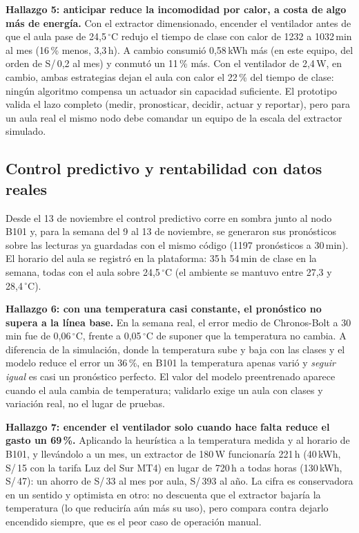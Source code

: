 \documentclass[10pt,a4paper]{article}
\begin{document}
\textbf{Hallazgo 5: anticipar reduce la incomodidad por calor, a costa de algo más de energía.} Con el extractor dimensionado, encender el ventilador antes de que el aula pase de 24,5\,$^\circ$C redujo el tiempo de clase con calor de 1232 a 1032\,min al mes (16\,\% menos, 3,3\,h). A cambio consumió 0,58\,kWh más (en este equipo, del orden de S/\,0,2 al mes) y conmutó un 11\,\% más. Con el ventilador de 2,4\,W, en cambio, ambas estrategias dejan el aula con calor el 22\,\% del tiempo de clase: ningún algoritmo compensa un actuador sin capacidad suficiente. El prototipo valida el lazo completo (medir, pronosticar, decidir, actuar y reportar), pero para un aula real el mismo nodo debe comandar un equipo de la escala del extractor simulado.

\subsection{Control predictivo y rentabilidad con datos reales}
Desde el 13 de noviembre el control predictivo corre en sombra junto al nodo B101 y, para la semana del 9 al 13 de noviembre, se generaron sus pronósticos sobre las lecturas ya guardadas con el mismo código (1197 pronósticos a 30\,min). El horario del aula se registró en la plataforma: 35\,h 54\,min de clase en la semana, todas con el aula sobre 24,5\,$^\circ$C (el ambiente se mantuvo entre 27,3 y 28,4\,$^\circ$C).

\textbf{Hallazgo 6: con una temperatura casi constante, el pronóstico no supera a la línea base.} En la semana real, el error medio de Chronos-Bolt a 30\,min fue de 0,06\,$^\circ$C, frente a 0,05\,$^\circ$C de suponer que la temperatura no cambia. A diferencia de la simulación, donde la temperatura sube y baja con las clases y el modelo reduce el error un 36\,\%, en B101 la temperatura apenas varió y \emph{seguir igual} es casi un pronóstico perfecto. El valor del modelo preentrenado aparece cuando el aula cambia de temperatura; validarlo exige un aula con clases y variación real, no el lugar de pruebas.

\textbf{Hallazgo 7: encender el ventilador solo cuando hace falta reduce el gasto un 69\,\%.} Aplicando la heurística a la temperatura medida y al horario de B101, y llevándolo a un mes, un extractor de 180\,W funcionaría 221\,h (40\,kWh, S/\,15 con la tarifa Luz del Sur MT4) en lugar de 720\,h a todas horas (130\,kWh, S/\,47): un ahorro de S/\,33 al mes por aula, S/\,393 al año. La cifra es conservadora en un sentido y optimista en otro: no descuenta que el extractor bajaría la temperatura (lo que reduciría aún más su uso), pero compara contra dejarlo encendido siempre, que es el peor caso de operación manual.
\end{document}
